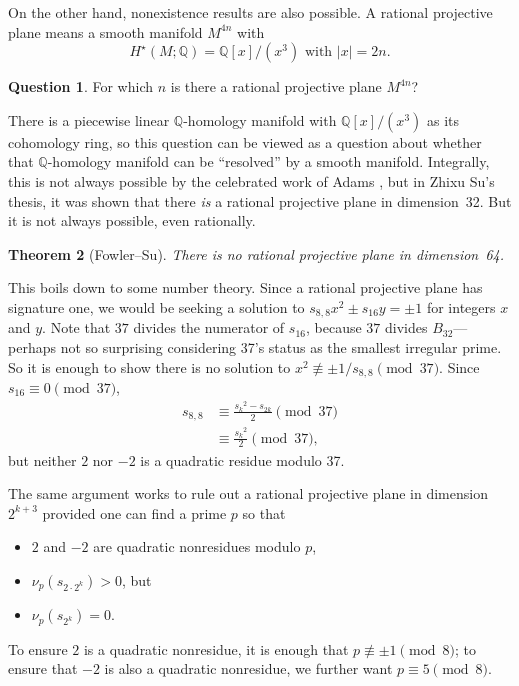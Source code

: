 \documentclass[12pt]{amsart}
\newtheorem{theorem}{Theorem}
\theoremstyle{definition}
\newtheorem{question}[theorem]{Question}
\newcommand{\Q}{\mathbb{Q}}
\begin{document}
On the other hand, nonexistence results are also possible.
A rational projective plane means a smooth manifold $M^{4n}$ with
$$
H^\star(M;\Q) = \Q[x]/(x^3) \mbox{ with $|x| = 2n$}.
$$
\begin{question}
  For which $n$ is there a rational projective plane $M^{4n}$?
\end{question}
There is a piecewise linear $\mathbb{Q}$-homology manifold with
$\Q[x]/(x^3)$ as its cohomology ring, so this question can be viewed
as a question about whether that $\mathbb{Q}$-homology manifold can be
``resolved'' by a smooth manifold.  Integrally, this is not always
possible by the celebrated work of Adams \cite{MR133837}, but in Zhixu
Su's thesis, it was shown that there \textit{is} a rational projective
plane in dimension~32.  But it is not always possible, even
rationally.
\begin{theorem}[Fowler--Su]
  There is no rational projective plane in dimension~64.
\end{theorem}
This boils down to some number theory.  Since a rational projective
plane has signature one, we would be seeking a solution to $s_{8,8}
x^2 \pm s_{16} y = \pm 1$ for integers $x$ and $y$.  Note that $37$
divides the numerator of $s_{16}$, because $37$ divides
$B_{32}$---perhaps not so surprising considering 37's status as the
smallest irregular prime.  So it is enough to show there is no
solution to $x^2 \not\equiv \pm 1/s_{8,8} \pmod{37}$.  Since $s_{16}
\equiv 0 \pmod{37}$,
\begin{align*}
  s_{8,8}
  &\equiv \frac{{s_k}^2 - s_{2k}}{2} \pmod{37} \\
  &\equiv \frac{{s_k}^2}{2} \pmod{37},
\end{align*}
but neither $2$ nor $-2$ is a quadratic residue modulo 37.

The same argument works to rule out a rational projective plane in
dimension $2^{k+3}$ provided one can find a prime $p$ so that
\begin{itemize}
\item $2$ and $-2$ are quadratic nonresidues modulo $p$,
\item $\nu_p(s_{2 \cdot 2^k}) > 0$, but
\item $\nu_p(s_{2^k}) = 0$.
\end{itemize}
To ensure $2$ is a quadratic nonresidue, it is enough that $p
\not\equiv \pm 1 \pmod 8$; to ensure that $-2$ is also a quadratic
nonresidue, we further want $p \equiv 5 \pmod 8$.
\end{document}
